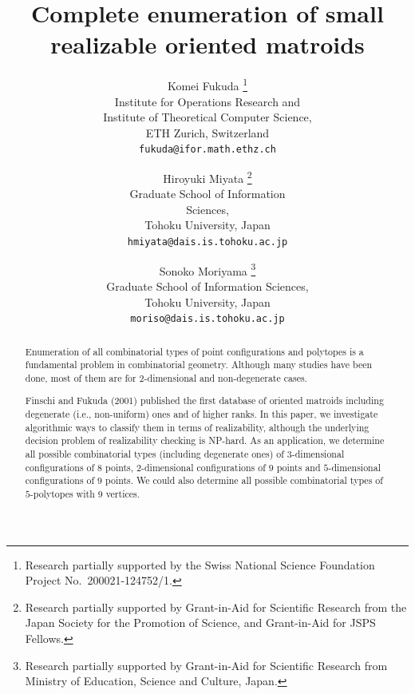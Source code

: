 \documentclass{article}
\begin{document}

\title{Complete enumeration of small realizable oriented matroids} 


\author{
Komei Fukuda
\thanks{
Research partially supported by the Swiss National Science Foundation Project
	No.~200021-124752/1.}\\
        Institute for Operations Research and \\
        Institute of Theoretical Computer Science, \\
ETH Zurich, Switzerland\\
{\tt fukuda@ifor.math.ethz.ch}
\and
Hiroyuki Miyata
\thanks{Research partially supported by Grant-in-Aid for Scientific Research from the Japan Society for the Promotion of Science, 
and Grant-in-Aid for JSPS Fellows.}\\
Graduate School of Information \\
Sciences,\\
Tohoku University, Japan\\
{\tt hmiyata@dais.is.tohoku.ac.jp}
\and
Sonoko Moriyama
\thanks{Research partially supported by Grant-in-Aid for Scientific
    Research from Ministry of Education, Science and Culture, Japan.}\\
    Graduate School of Information Sciences,\\
     Tohoku University, Japan\\
     {\tt moriso@dais.is.tohoku.ac.jp}
}


\maketitle


\begin{abstract}
Enumeration of all combinatorial types of point configurations and polytopes
is a fundamental problem in combinatorial geometry. 
Although many studies have been done, most of them
are for $2$-dimensional and non-degenerate cases.  

Finschi and Fukuda (2001) published the first database of oriented 
matroids including degenerate (i.e., non-uniform) ones and of higher ranks.
In this paper, we investigate algorithmic ways to classify them 
in terms of realizability, although the underlying decision problem
of realizability checking is NP-hard.  As an application, we determine
all possible combinatorial types (including degenerate ones) of $3$-dimensional configurations of $8$ points, $2$-dimensional configurations of $9$ points and $5$-dimensional configurations of $9$ points.
We could also determine all possible combinatorial types of $5$-polytopes with $9$ vertices.
\end{abstract}
\end{document}
